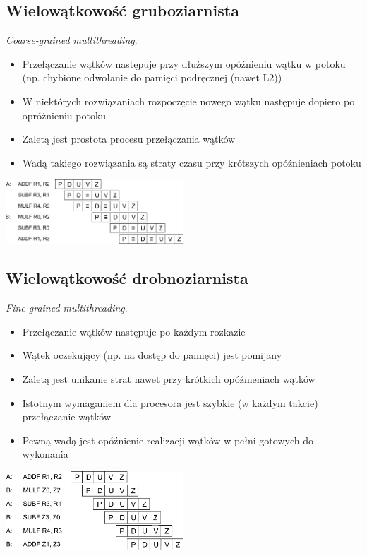 	\subsection{Wielowątkowość gruboziarnista}
		\emph{Coarse-grained multithreading}.
		\begin{itemize}
			\item Przełączanie wątków następuje przy dłuższym opóźnieniu wątku w potoku (np. chybione odwołanie do pamięci podręcznej (nawet L2))
			\item W niektórych rozwiązaniach rozpoczęcie nowego wątku następuje dopiero po opróżnieniu potoku
			\item Zaletą jest prostota procesu przełączania wątków
			\item Wadą takiego rozwiązania są straty czasu przy krótszych opóźnieniach potoku
		\end{itemize}
		\begin{center}
			\vspace{0.3cm}
			\includegraphics[width=0.5\textwidth]{./images/wielowatkowosc01}
		\end{center}
	\subsection{Wielowątkowość drobnoziarnista}
		\emph{Fine-grained multithreading}.
		\begin{itemize}
			\item Przełączanie wątków następuje po każdym rozkazie
			\item Wątek oczekujący (np. na dostęp do pamięci) jest pomijany
			\item Zaletą jest unikanie strat nawet przy krótkich opóźnieniach wątków
			\item Istotnym wymaganiem dla procesora jest szybkie (w każdym takcie) przełączanie wątków
			\item Pewną wadą jest opóźnienie realizacji wątków w pełni gotowych do wykonania
		\end{itemize}
		\begin{center}
			\vspace{0.3cm}
			\includegraphics[width=0.5\textwidth]{./images/wielowatkowosc02}
		\end{center}
